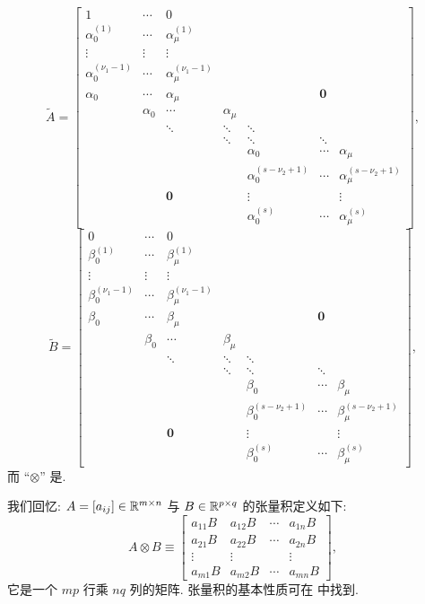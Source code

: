 \[
  \widetilde{A}=\begin{bmatrix}
    1 & \cdots & 0 & & & & \\
    \alpha_0^{(1)} & \cdots & \alpha_{\mu}^{(1)} & & & & \\
    \vdots & \vdots & \vdots & & & & \\
    \alpha_0^{(\nu_1-1)} & \cdots & \alpha_{\mu}^{(\nu_1-1)} & & & & \\
    \alpha_0 & \cdots & \alpha_{\mu} & & & \mathbf{0} & \\
    & \alpha_0 & \cdots & \alpha_{\mu} & & & \\
    & & \ddots & \ddots & \ddots & & \\
    & & & \ddots & \ddots & \ddots & \\
    & & & & \alpha_0 & \cdots & \alpha_{\mu}\\
    & & & & \alpha_0^{(s-\nu_2+1)} & \cdots & \alpha_{\mu}^{(s-\nu_2+1)}\\
    & & \mathbf{0} & & \vdots & & \vdots\\
    & & & & \alpha_0^{(s)} & \cdots & \alpha_{\mu}^{(s)}
  \end{bmatrix},
\]
\[
  \widetilde{B}=\begin{bmatrix}
    0 & \cdots & 0 & & & & \\
    \beta_0^{(1)} & \cdots & \beta_{\mu}^{(1)} & & & & \\
    \vdots & \vdots & \vdots & & & & \\
    \beta_0^{(\nu_1-1)} & \cdots & \beta_{\mu}^{(\nu_1-1)} & & & & \\
    \beta_0 & \cdots & \beta_{\mu} & & & \mathbf{0} & \\
    & \beta_0 & \cdots & \beta_{\mu} & & & \\
    & & \ddots & \ddots & \ddots & & \\
    & & & \ddots & \ddots & \ddots & \\
    & & & & \beta_0 & \cdots & \beta_{\mu}\\
    & & & & \beta_0^{(s-\nu_2+1)} & \cdots & \beta_{\mu}^{(s-\nu_2+1)}\\
    & & \mathbf{0} & & \vdots & & \vdots\\
    & & & & \beta_0^{(s)} & \cdots & \beta_{\mu}^{(s)}
  \end{bmatrix},
\]
而 ``$\otimes$'' 是.

我们回忆: $A=[a_{ij}]\in\mathbb{R}^{m\times n}$ 与 $B\in\mathbb{R}^{p\times q}$ 的张量积定义如下:
\[
  A\otimes B\equiv\begin{bmatrix}
    a_{11}B & a_{12}B & \cdots & a_{1n}B\\
    a_{21}B & a_{22}B & \cdots & a_{2n}B\\
    \vdots & \vdots & & \vdots\\
    a_{m1}B & a_{m2}B & \cdots & a_{mn}B
  \end{bmatrix},
\]
它是一个 $mp$ 行乘 $nq$ 列的矩阵. 张量积的基本性质可在 \cite{src:32,src:42} 中找到.

